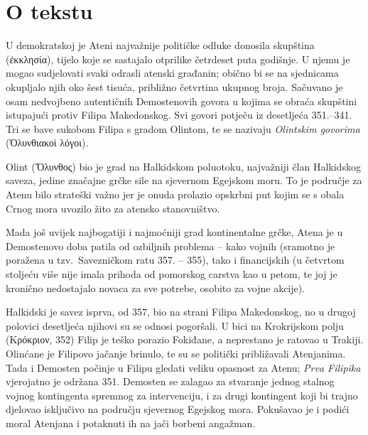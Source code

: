 


\section*{O tekstu}

U demokratskoj je Ateni najvažnije političke odluke donosila skupština \textgreek[variant=ancient]{(ἐκκλησία),} tijelo koje se sastajalo otprilike četrdeset puta godišnje. U njemu je mogao sudjelovati svaki odrasli atenski građanin; obično bi se na sjednicama okupljalo njih oko šest tisuća, približno četvrtina ukupnog broja. Sačuvano je osam nedvojbeno autentičnih Demostenovih govora u kojima se obraća skupštini istupajući protiv Filipa Makedonskog. Svi govori potječu iz desetljeća 351.–341. Tri se bave sukobom Filipa s gradom Olintom, te se nazivaju \textit{Olintskim govorima} \textgreek[variant=ancient]{(Ὀλυνθιακοὶ λόγοι).}

Olint \textgreek[variant=ancient]{(Ὄλυνθος)} bio je grad na Halkidskom poluotoku, najvažniji član Halkidskog saveza, jedine značajne grčke sile na sjevernom Egejskom moru. To je područje za Atenu bilo strateški važno jer je onuda prolazio opskrbni put kojim se s obala Crnog mora uvozilo žito za atensko stanovništvo. 

Mada još uvijek najbogatiji i najmoćniji grad kontinentalne grčke, Atena je u Demostenovo doba patila od ozbiljnih problema – kako vojnih (sramotno je poražena u tzv.\ Savezničkom ratu 357. – 355), tako i financijskih (u četvrtom stoljeću više nije imala prihoda od pomorskog carstva kao u petom, te joj je kronično nedostajalo novaca za sve potrebe, osobito za vojne akcije).

Halkidski je savez isprva, od 357, bio na strani Filipa Makedonskog, no u drugoj polovici desetljeća njihovi su se odnosi pogoršali. U bici na Krokrijskom polju \textgreek[variant=ancient]{(Κρόκριον,} 352) Filip je teško porazio Fokiđane, a neprestano je ratovao u Trakiji. Olinćane je Filipovo jačanje brinulo, te su se politički približavali Atenjanima. Tada i Demosten počinje u Filipu gledati veliku opasnost za Atenu; \textit{Prva Filipika} vjerojatno je održana 351. Demosten se zalagao za stvaranje jednog stalnog vojnog kontingenta spremnog za intervenciju, i za drugi kontingent koji bi trajno djelovao isključivo na području sjevernog Egejskog mora. Pokušavao je i podići moral Atenjana i potaknuti ih na jači borbeni angažman.

